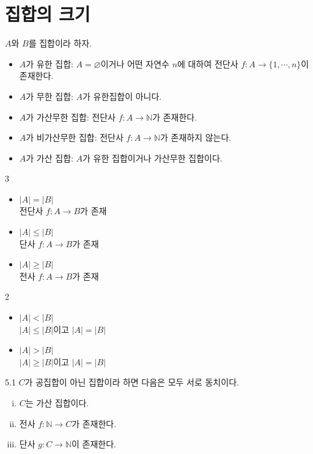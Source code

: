 \documentclass{article}
\begin{document}
\section{집합의 크기}
$A$와 $B$를 집합이라 하자.
\begin{itemize}
    \item $A$가 유한 집합: $A=\varnothing$이거나 어떤 자연수 $n$에 대하여 전단사 $f:A\to\{1,\cdots,n\}$이 존재한다.
    \item $A$가 무한 집합: $A$가 유한집합이 아니다.
    \item $A$가 가산무한 집합: 전단사 $f:A\to\mathbb N$가 존재한다.
    \item $A$가 비가산무한 집합: 전단사 $f:A\to\mathbb N$가 존재하지 않는다.
    \item $A$가 가산 집합: $A$가 유한 집합이거나 가산무한 집합이다.
\end{itemize}

\begin{multicols}{3}
    \begin{itemize}
        \item $\vert A\vert=\vert B\vert$ \\
            전단사 $f:A\to B$가 존재
        \item $\vert A\vert\leq\vert B\vert$ \\
            단사 $f:A\to B$가 존재
        \item $\vert A\vert\geq\vert B\vert$ \\
            전사 $f:A\to B$가 존재
    \end{itemize}
\end{multicols}

\begin{multicols}{2}
    \begin{itemize}
        \item $\vert A\vert<\vert B\vert$ \\
            $\vert A\vert\leq\vert B\vert$이고 $\vert A\vert=\vert B\vert$
        \item $\vert A\vert>\vert B\vert$ \\
            $\vert A\vert\geq\vert B\vert$이고 $\vert A\vert=\vert B\vert$
    \end{itemize}
\end{multicols}

\begin{prop}{}{5.1}
    $C$가 공집합이 아닌 집합이라 하면 다음은 모두 서로 동치이다.
    \begin{enumerate}[(i)]
        \item $C$는 가산 집합이다.
        \item 전사 $f:\mathbb N\to C$가 존재한다.
        \item 단사 $g:C\to\mathbb N$이 존재한다.
    \end{enumerate}
\end{prop}
\end{document}
